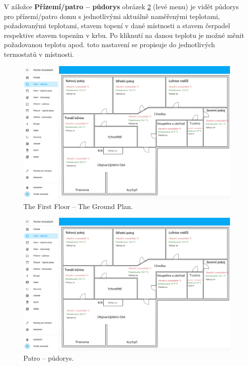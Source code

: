 \begin{Czech}
V záložce \textbf{Přízemí/patro – půdorys} obrázek \ref{fig:floor-plan-first-floor} (levé menu) je vidět půdorys pro přízemí/patro domu s jednotlivými aktuálně naměřenými teplotami, požadovanými teplotami, stavem topení v dané místnosti a stavem čerpadel respektive stavem topením v krbu. Po kliknutí na danou teplotu je možné měnit požadovanou teplotu apod. toto nastavení se propisuje do jednotlivých termostatů v místnosti.
\end{Czech}


\begin{English}
\begin{figure}[H]
    \centering
    \includegraphics[width=1\textwidth]{pictures/czech/software/floor-plan-first-floor.png}
    \caption{The First Floor – The Ground Plan.}
    \label{fig:floor-plan-first-floor}
\end{figure}
\end{English}

\begin{Czech}
\begin{figure}[H]
    \centering
    \includegraphics[width=1\textwidth]{pictures/czech/software/floor-plan-first-floor.png}
    \caption{Patro – půdorys.}
    \label{fig:floor-plan-first-floor}
\end{figure}
\end{Czech}

